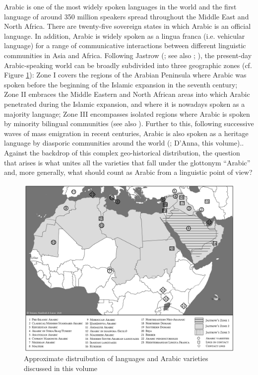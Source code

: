 \documentclass[output=paper]{langsci/langscibook}
\begin{document}
Arabic is one of the most widely spoken languages in the world and the first language of around 350 million speakers spread throughout the Middle East and North Africa. There are twenty-five sovereign states in which Arabic is an official language. In addition, Arabic is widely spoken as a lingua franca (i.e. vehicular language) for a range of communicative interactions between different linguistic communities in Asia and Africa. Following Jastrow (\citeyear{Jastrow2002}; see also \citealt{Watson2011dialectsoverview}; \citealt{Manfrediforthcoming}), the present-day Arabic-speaking world can be broadly subdivided into three geographic zones (cf. Figure \ref{intromap}): Zone I covers the regions of the Arabian Peninsula where Arabic was spoken before the beginning of the Islamic expansion in the seventh century; Zone II embraces the Middle Eastern and North African areas into which Arabic penetrated during the Islamic expansion, and where it is nowadays spoken as a majority language; Zone III encompasses isolated regions where Arabic is spoken by minority bilingual communities (see also \citealt{Owens2000editor}). Further to this, following successive waves of mass emigration in recent centuries, Arabic is also spoken as a heritage language by diasporic communities around the world (\citealt{Rouchdy_arabic_1992,BoumansdeRuiter2002}; D’Anna, this volume).. Against the backdrop of this complex geo-historical distribution, the question that arises is what unites all the varieties that fall under the glottonym ``Arabic'' and, more generally, what should count as Arabic from a linguistic point of view?

\begin{figure}
\includegraphics[width=\textwidth]{figures/intromap.jpg}
\caption{Approximate distruibution of languages and Arabic varieties discussed in this volume}
\label{intromap}
\end{figure}
\end{document}
